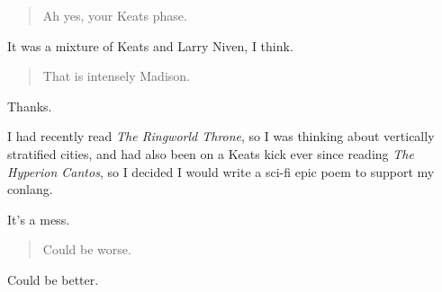 \begin{quote}
Ah yes, your Keats phase.
\end{quote}

It was a mixture of Keats and Larry Niven, I think.

\begin{quote}
That is intensely Madison.
\end{quote}

Thanks.

I had recently read \emph{The Ringworld Throne}, so I was thinking about vertically stratified cities, and had also been on a Keats kick ever since reading \emph{The Hyperion Cantos}, so I decided I would write a sci-fi epic poem to support my conlang.

It's a mess.

\begin{quote}
Could be worse.
\end{quote}

Could be better.
